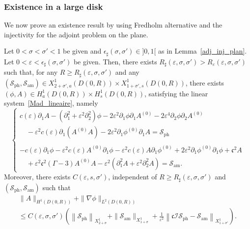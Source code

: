 \documentclass[AHL,Unicode,longabstracts,published]{cedram}
\newcommand*\p{\partial}
\newcommand{\amm}{\mathrm{am}}
\newcommand{\phl}{\mathrm{ph}}
\newcommand*\BI{\mathcal{I}}
\newcommand*\BS{\mathcal{S}}
\newcommand*\cs{{\mathfrak c}}
\newcommand*\gs{\geqslant }
\newcommand*\ls{\leqslant }
\newcommand*\e{\varepsilon}
\newcommand*\ep{\epsilon}
\newcommand*\s{\sigma}
\begin{document}
\subsubsection{Existence in a large disk}

We now prove an existence result by using Fredholm alternative and the injectivity for the adjoint problem on the plane.



\begin{lemm}\label{esti-apriori_disque2}
Let $ 0 < \s < \s' < 1 $ be given and $ \ep_\sharp (\s, \s') \in]0,1[$ as in Lemma~\ref{adj_inj_plan}. Let $ 0 < \e < \ep_\sharp (\s, \s') $ be given. Then, there exists $ R_\sharp(\e, \s, \s') > R_\e(\e, \s, \s') $ such that, for any $ R \gs R_\sharp(\e, \s, \s') $ and any $ (\BS_{\phl}, \BS_{\amm}) \in X^{1}_{2+\s', a} (D(0,R)) \times X^{1}_{1+\s', s} (D(0,R))$, there exists $ (\phi, A) \in H^{1}_a (D(0,R)) \times H^{1}_s (D(0,R)) $, satisfying the linear system~\eqref{Mad_lineaire}, namely
\begin{equation*}
\left\{
\begin{array}{ll}
c(\e) \p_{1} A - \left(\p_{1}^2 + \e^2 \p^2_{2}\right) \phi - 2 \e^2 \p_{1} \phi \p_{1} A^{(0)} - 2 \e^4 \p_{2} \phi \p_{2} A^{(0)}
\\
\quad - \e^2 c(\e) \p_1 \left(A^{(0)} A\right) - 2 \e^2 \p_{1} \phi^{(0)} \p_{1} A = \BS_{\phl} \\ \ \\
- c(\e) \p_{1} \phi - \e^2 c(\e) A^{(0)} \p_1 \phi - \e^2 c(\e) A \p_1 \phi^{(0)} + 2 \e^2 \p_{1} \phi^{(0)} \p_{1} \phi + \cs^2 A
\\
\quad + \e^2 \cs^2 (\Gamma -3) A^{(0)} A - \e^2 \left(\p_{1}^2 A + \e^2 \p_{2}^2 A\right) = \BS_{\amm}.
\end{array}\right.
\end{equation*}
Moreover, there exists $ C (\e, s, \s') $, independent of $ R \gs R_\sharp(\e, \s, \s') $ and $ (\BS_{\phl}, \BS_{\amm}) $ such that
\begin{multline*}
\| A \|_{ H^1 (D(0,R)) }  + \| \nabla \phi \|_{ L^2 (D(0,R)) }
\\ 
 \ls C (\e, \s, \s')
\left(
\left\| \BS_{\phl} \right\|_{ X^{1}_{ 2+\s } } + \| \BS_{\amm} \|_{ X^{ 1}_{1+\s} } + \frac{1}{\e^2} \left\| \cs \BI \BS_{\phl} - \BS_{\amm} \right\|_{ X^{1}_{1+\s'} }
\right).
\end{multline*}
\end{lemm}
\end{document}
